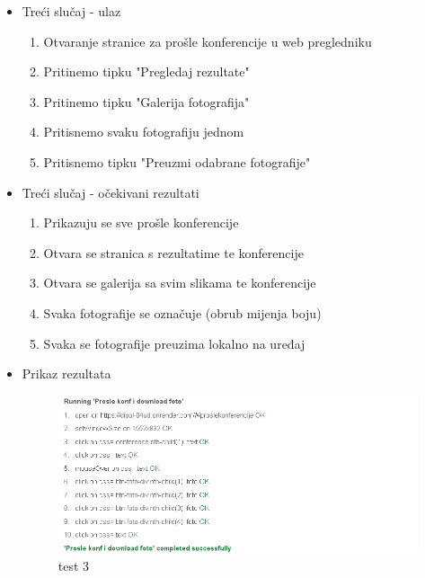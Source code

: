 			 \newpage
			 
			 \begin{itemize}
			 	\item Treći slučaj - ulaz
			 	\begin{enumerate}
			 		\item Otvaranje stranice za prošle konferencije u web pregledniku
			 		\item Pritinemo tipku "Pregledaj rezultate"
			 		\item Pritinemo tipku "Galerija fotografija"
			 		\item Pritisnemo svaku fotografiju jednom
			 		\item Pritisnemo tipku "Preuzmi odabrane fotografije"
			 	\end{enumerate}
			 	\item Treći slučaj - očekivani rezultati
			 	\begin{enumerate}
			 		\item Prikazuju se sve prošle konferencije
			 		\item Otvara se stranica s rezultatime te konferencije
			 		\item Otvara se galerija sa svim slikama te konferencije
			 		\item Svaka fotografije se označuje (obrub mijenja boju)
			 		\item Svaka se fotografije preuzima lokalno na uređaj
			 	\end{enumerate}
			 	\item Prikaz rezultata
			 	\begin{figure}[htb]
			 		\centering
			 		\includegraphics[width=11cm]{slike/test_3.png}
			 		\caption{test 3}
			 		\label{fig:fer-logo}
			 	\end{figure}
			 \end{itemize}
			 
			 \newpage
			 
